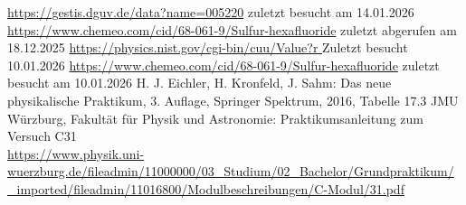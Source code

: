 \documentclass[a4paper,10pt,twocolumn]{scrartcl} %
\begin{document}


	






	
\begin{thebibliography}{}    %
	\url{https://gestis.dguv.de/data?name=005220} zuletzt besucht am 14.01.2026
	\url{https://www.chemeo.com/cid/68-061-9/Sulfur-hexafluoride} zuletzt abgerufen am 18.12.2025
	\url{https://physics.nist.gov/cgi-bin/cuu/Value?r } Zuletzt besucht 10.01.2026
	\url{https://www.chemeo.com/cid/68-061-9/Sulfur-hexafluoride} zuletzt besucht am 10.01.2026
	H. J. Eichler, H. Kronfeld, J. Sahm: Das neue physikalische Praktikum, 3. Auflage, Springer Spektrum, 2016, Tabelle 17.3
	JMU Würzburg, Fakultät für Physik und Astronomie: Praktikumsanleitung zum Versuch C31\\
	\url{https://www.physik.uni-wuerzburg.de/fileadmin/11000000/03_Studium/02_Bachelor/Grundpraktikum/_imported/fileadmin/11016800/Modulbeschreibungen/C-Modul/31.pdf}
\end{thebibliography}
\end{document}
